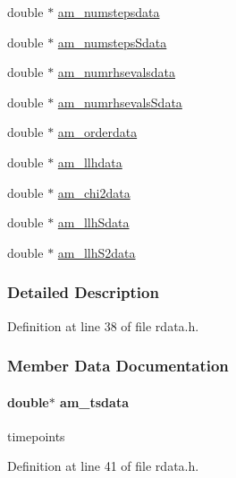 \begin{DoxyCompactItemize}
double $\ast$ \hyperlink{struct_return_data_a2ebada170b4bc6a2337794e4ec08d77c}{am\+\_\+numstepsdata}
\item 
double $\ast$ \hyperlink{struct_return_data_a6852d3762d59842903ef737ed511dc43}{am\+\_\+numsteps\+Sdata}
\item 
double $\ast$ \hyperlink{struct_return_data_a480d4eb0a1a568f64b8e939105a0b627}{am\+\_\+numrhsevalsdata}
\item 
double $\ast$ \hyperlink{struct_return_data_a77e958126968de6f5ee3bd1d22129641}{am\+\_\+numrhsevals\+Sdata}
\item 
double $\ast$ \hyperlink{struct_return_data_af792e4a1c5c23c5232ef9398e25de1a7}{am\+\_\+orderdata}
\item 
double $\ast$ \hyperlink{struct_return_data_af95fa143e0e524652f9a818f6288b544}{am\+\_\+llhdata}
\item 
double $\ast$ \hyperlink{struct_return_data_ae0fc05ce8c52bdda5c7bff541c79945d}{am\+\_\+chi2data}
\item 
double $\ast$ \hyperlink{struct_return_data_af72a5801bf4c6b957812c8b2471ecf41}{am\+\_\+llh\+Sdata}
\item 
double $\ast$ \hyperlink{struct_return_data_a9ea6527fa5408fa1ae074cdbd83ed11f}{am\+\_\+llh\+S2data}
\end{DoxyCompactItemize}


\subsubsection{Detailed Description}


Definition at line 38 of file rdata.\+h.



\subsubsection{Member Data Documentation}
\hypertarget{struct_return_data_a577298549da7c9dbe3d93fbf3bc17866}{}
\paragraph[{am\+\_\+tsdata}]{\setlength{\rightskip}{0pt plus 5cm}double$\ast$ am\+\_\+tsdata}\label{struct_return_data_a577298549da7c9dbe3d93fbf3bc17866}
timepoints 

Definition at line 41 of file rdata.\+h.

